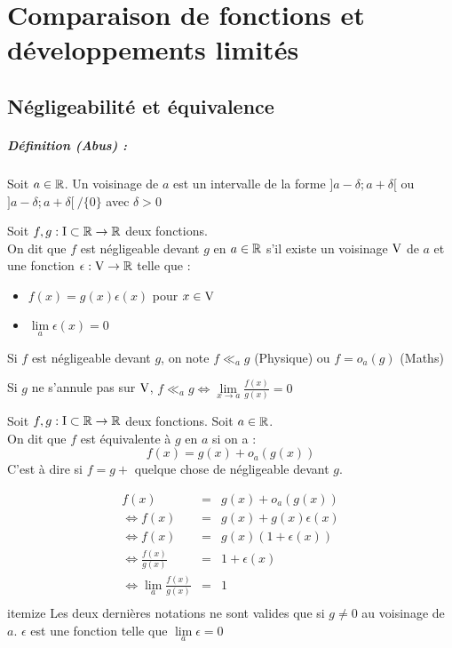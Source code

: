 \chapter{Comparaison de fonctions et développements limités}
\section{Négligeabilité  et équivalence}

\paragraph{Définition (Abus) :}
Soit $a\in\mathbb{R}$. Un voisinage de $a$ est un intervalle de la forme $]a-\delta;a+\delta[$ ou $]a-\delta;a+\delta[~/\{0\}$ avec $\delta>0$

Soit $f,g:\text{I}\subset\mathbb{R} \to \mathbb{R}$ deux fonctions.\\
On dit que $f$ est négligeable devant $g$ en $a\in\mathbb{R}$ s'il existe un voisinage $\text{V}$ de $a$ et une fonction $\epsilon:\text{V}\to\mathbb{R}$ telle que :
\begin{itemize}
	\item $f(x) = g(x)\epsilon (x)$ pour $x\in \text{V}$
	\item $\lim\limits_{a}\epsilon(x)=0$
\end{itemize}
\notation{}
Si $f$ est négligeable devant $g$, on note $f \ll_{a}g$ (Physique) ou $f=o_a(g)$ (Maths)

\remarque{}
Si $g$ ne s'annule pas sur $\text{V}$, $f \ll_a g \Leftrightarrow \lim\limits_{x\to a}\frac{f(x)}{g(x)}=0$

\exemple{}

Soit $f,g:\text{I}\subset\mathbb{R} \to \mathbb{R}$ deux fonctions. Soit $a\in\mathbb{R}$.\\
On dit que $f$ est équivalente à $g$ en $a$ si on a :
$$f(x) = g(x) + o_a(g(x))$$
C'est à dire si $f=g+$ quelque chose de négligeable devant $g$.

\remarque{}
\begin{eqnarray*}
		f(x) &=& g(x) + o_a(g(x))\\
		\Leftrightarrow f(x) & = & g(x) + g(x)\epsilon(x)\\
		\Leftrightarrow f(x) & = & g(x)(1+\epsilon(x))\\
		\Leftrightarrow \frac{f(x)}{g(x)} &=& 1 + \epsilon(x)\\
		\Leftrightarrow \lim\limits_a\frac{f(x)}{g(x)} &=& 1\\
\end{eqnarray*}itemize
Les deux dernières notations ne sont valides que si $g\neq 0$ au voisinage de $a$. $\epsilon$ est une fonction telle que $\lim\limits_a\epsilon=0$ 

